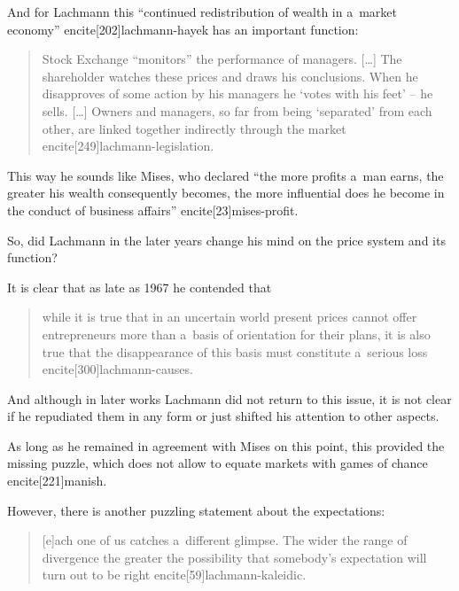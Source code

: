 {\begin{quote}
\end{quote}

And for Lachmann this ``continued redistribution of wealth in a~market economy'' encite[202]{lachmann-hayek} has an important function:

\begin{quote}

Stock Exchange ``monitors'' the performance of managers. [\ldots] The shareholder watches these prices and draws his conclusions. When he disapproves of some action by his managers he `votes with his feet' -- he sells. [\ldots] Owners and managers, so far from being `separated' from each other, are linked together indirectly through the market encite[249]{lachmann-legislation}.

\end{quote}

This way he sounds like Mises, who declared ``the more profits a~man earns, the greater his wealth consequently becomes, the more influential does he become in the conduct of business affairs'' encite[23]{mises-profit}.



So, did Lachmann in the later years change his mind on the price system and its function?

It is clear that as late as 1967 he contended that

\begin{quote}

while it is true that in an uncertain world present prices cannot offer entrepreneurs more than a~basis of orientation for their plans, it is also true that the disappearance of this basis must constitute a~serious loss encite[300]{lachmann-causes}.

\end{quote}

And although in later works Lachmann did not return to this issue, it is not clear if he repudiated them in any form or just shifted his attention to other aspects.

As long as he remained in agreement with Mises on this point, this provided the missing puzzle, which does not allow to equate markets with games of chance encite[221]{manish}.



However, there is another puzzling statement about the expectations:

\begin{quote}

[e]ach one of us catches a~different glimpse. The wider the range of divergence the greater the possibility that somebody's expectation will turn out to be right encite[59]{lachmann-kaleidic}.


\end{quote}}

